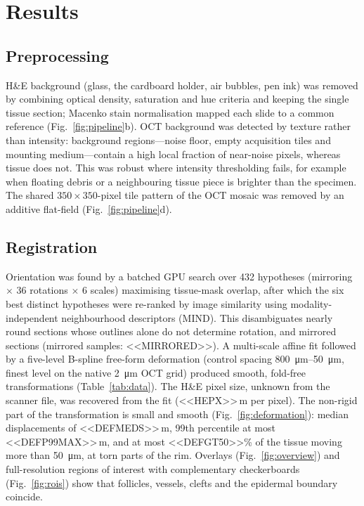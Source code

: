 \documentclass[9pt,twocolumn]{extarticle}
\begin{document}
\section{Results}
\subsection{Preprocessing} H\&E background (glass, the cardboard holder, air bubbles, pen ink) was removed by combining optical density, saturation and hue criteria and keeping the single tissue section; Macenko stain normalisation\cite{macenko2009} mapped each slide to a common reference (Fig.~\ref{fig:pipeline}b). OCT background was detected by texture rather than intensity: background regions---noise floor, empty acquisition tiles and mounting medium---contain a high local fraction of near-noise pixels, whereas tissue does not. This was robust where intensity thresholding fails, for example when floating debris or a neighbouring tissue piece is brighter than the specimen. The shared $350\times350$-pixel tile pattern of the OCT mosaic was removed by an additive flat-field (Fig.~\ref{fig:pipeline}d).

\subsection{Registration} Orientation was found by a batched GPU search over 432 hypotheses (mirroring $\times$ 36 rotations $\times$ 6 scales) maximising tissue-mask overlap, after which the six best distinct hypotheses were re-ranked by image similarity using modality-independent neighbourhood descriptors (MIND)\cite{heinrich2012}. This disambiguates nearly round sections whose outlines alone do not determine rotation, and mirrored sections (mirrored samples: <<MIRRORED>>). A multi-scale affine fit followed by a five-level B-spline free-form deformation\cite{rueckert1999} (control spacing \SIrange{800}{50}{\micro\metre}, finest level on the native \SI{2}{\micro\metre} OCT grid) produced smooth, fold-free transformations (Table~\ref{tab:data}). The H\&E pixel size, unknown from the scanner file, was recovered from the fit (<<HEPX>>\,\textmu m per pixel). The non-rigid part of the transformation is small and smooth (Fig.~\ref{fig:deformation}): median displacements of <<DEFMEDS>>\,\textmu m, 99th percentile at most <<DEFP99MAX>>\,\textmu m, and at most <<DEFGT50>>\% of the tissue moving more than \SI{50}{\micro\metre}, at torn parts of the rim. Overlays (Fig.~\ref{fig:overview}) and full-resolution regions of interest with complementary checkerboards (Fig.~\ref{fig:rois}) show that follicles, vessels, clefts and the epidermal boundary coincide.
\end{document}
